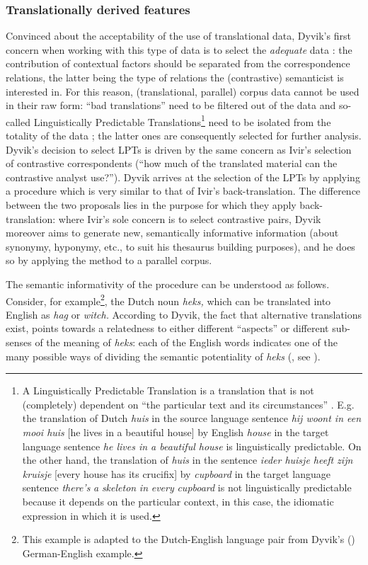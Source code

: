 \subsubsection{Translationally derived features}
\label{sec:2.3.4.2}  
Convinced about the acceptability of the use of translational data, Dyvik’s first concern when working with this type of data is to select the \textit{adequate} data \citep[52]{johansson_translational_1998}: the contribution of contextual factors should be separated from the correspondence relations, the latter being the type of relations the (contrastive) semanticist is interested in. For this reason, (translational, parallel) corpus data cannot be used in their raw form: “bad translations” need to be filtered out of the data and so-called Linguistically Predictable Translations\footnote{A Linguistically Predictable Translation is a translation that is not (completely) dependent on “the particular text and its circumstances” \citep{johansson_translational_1998}. E.g. the translation of Dutch \textit{huis} in the source language sentence \textit{hij woont in een mooi huis} [he lives in a beautiful house] by English \textit{house} in the target language sentence \textit{he lives in a beautiful house} is linguistically predictable. On the other hand, the translation of \textit{huis} in the sentence \textit{ieder huisje heeft zijn kruisje} [every house has its crucifix] by \textit{cupboard} in the target language sentence \textit{there’s} \textit{a} \textit{skeleton} \textit{in} \textit{every} \textit{cupboard} is not linguistically predictable because it depends on the particular context, in this case, the idiomatic expression in which it is used.} need to be isolated from the totality of the data \citep{johansson_translational_1998}; the latter ones are consequently selected for further analysis. Dyvik’s decision to select LPTs is driven by the same concern as Ivir’s selection of contrastive correspondents (“how much of the translated material can the contrastive analyst use?”). Dyvik arrives at the selection of the LPTs by applying a procedure which is very similar to that of Ivir’s back-translation. The difference between the two proposals lies in the purpose for which they apply back-translation: where Ivir’s sole concern is to select contrastive pairs, Dyvik moreover aims to generate new, semantically informative information (about synonymy, hyponymy, etc., to suit his thesaurus building purposes), and he does so by applying the method to a parallel corpus.

The semantic informativity of the procedure can be understood as follows. Consider, for example\footnote{This example is adapted to the Dutch-English language pair from Dyvik’s (\citeyear[29--31]{langemets_translations_2005}) German-English example.}, the Dutch noun \textit{heks,} which can be translated into English as \textit{hag} or \textit{witch.} According to Dyvik, the fact that alternative translations exist, points towards a relatedness to either different ``aspects'' or different sub-senses of the meaning of \textit{heks}: each of the English words indicates one of the many possible ways of dividing the semantic potentiality of \textit{heks} (\citealt[31]{langemets_translations_2005}, see ).

